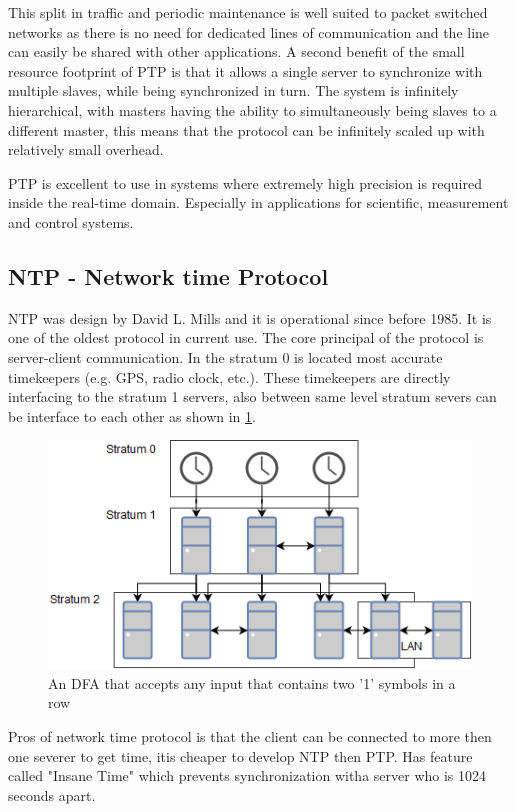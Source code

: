 \noindent This split in traffic and periodic maintenance is well suited to packet switched networks as there is no need for dedicated lines of communication and the line can easily be shared with other applications. A second benefit of the small resource footprint of PTP is that it allows a single server to synchronize with multiple slaves, while being synchronized in turn. The system is infinitely hierarchical, with masters having the ability to simultaneously being slaves to a different master, this means that the protocol can be infinitely scaled up with relatively small overhead.

\noindent PTP is excellent to use in systems where extremely high precision is required  inside the real-time domain. Especially in applications for scientific, measurement and control systems.

\subsection{NTP - Network time Protocol}

NTP was design by David L. Mills and it is operational since before 1985. It is one of the oldest protocol in
current use. The core principal of the protocol is server-client communication. In the stratum 0 is located
most accurate timekeepers (e.g. GPS, radio clock, etc.). These timekeepers are directly interfacing to the
stratum 1 servers, also between same level stratum severs can be interface to each other as shown in \ref{fig:NTP}.

\begin{figure}[H]\label{}
	\centering
	\includegraphics[scale=0.4]{synchronization/fig/NTP.png}
	\caption{An DFA that accepts any input that contains two '1' symbols in a row}
	\label{fig:NTP}
\end{figure}

\noindent Pros of network time protocol is that the client can be connected to more then one severer to get time, itis cheaper to develop NTP then PTP. Has feature called "Insane Time" which prevents synchronization witha server who is 1024 seconds apart.


